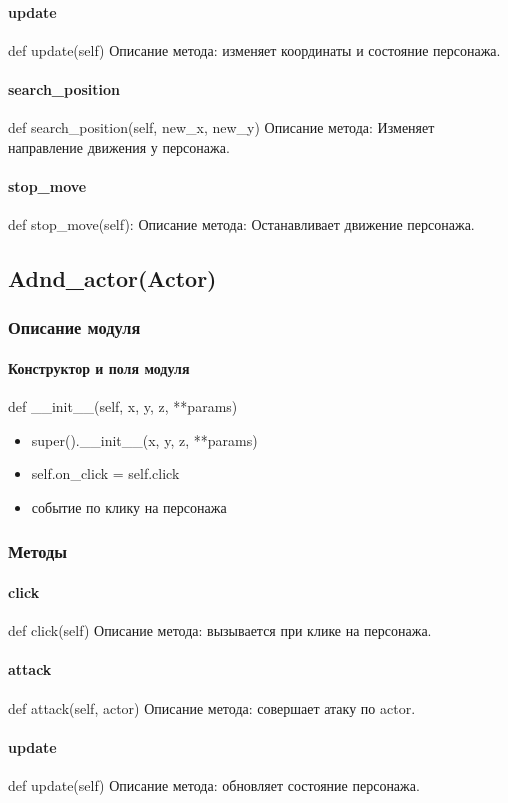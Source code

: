 \paragraph{update}
def update(self)
Описание метода: изменяет координаты и состояние персонажа.
\paragraph{search\_position}
def search\_position(self, new\_x, new\_y)
Описание метода:  Изменяет направление движения у персонажа.
\paragraph{stop\_move}
def stop\_move(self):
Описание метода: Останавливает движение персонажа.

\subsection{Adnd\_actor(Actor)}
\subsubsection{Описание модуля}
\paragraph{Конструктор и поля модуля}
def \_\_init\_\_(self, x, y, z, **params)
\begin{itemize}
	\item super().\_\_init\_\_(x, y, z, **params)
	\item self.on\_click = self.click
	\item событие по клику на персонажа
\end{itemize}
\subsubsection{Методы}
\paragraph{click}
def click(self)
Описание метода: вызывается при клике на персонажа.
\paragraph{attack}
def attack(self, actor)
Описание метода: совершает атаку по actor.
\paragraph{update}
def update(self)
Описание метода: обновляет состояние персонажа.

